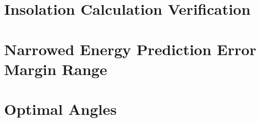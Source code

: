 \documentclass[%
    draft, %
    11pt,
    a4paper
]
{memoir}
\begin{document}

\begin{small}
%
\end{small}
\cleardoublepage




\pagestyle{ruled}

\begin{appendix}

\end{appendix}

\chapter{Insolation Calculation Verification}
\label{sec:Appendix:InsolationCalculationVerification}


\chapter{Narrowed Energy Prediction Error Margin Range}
\label{sec:Appendix:NarrowedEnergyPredictionErrorMarginRange}


\chapter{Optimal Angles}
\label{sec:Appendix:OptimalAngles}






\end{document}
